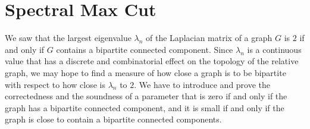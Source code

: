 \section{Spectral Max Cut}
We saw that the largest eigenvalue $ \lambda_n $ of the Laplacian matrix of a graph $ G $ is $ 2 $ if and only if $ G $ contains a bipartite connected component. Since $ \lambda_n $ is a continuous value that has a discrete and combinatorial effect on the topology of the relative graph, we may hope to find a measure of how close a graph is to be bipartite with respect to how close is $ \lambda_n $ to $ 2 $.
We have to introduce and prove the correctedness and the soundness of a parameter that is zero if and only
if the graph has a bipartite connected component, and it is small if and only if the graph is
close to contain a bipartite connected components.
